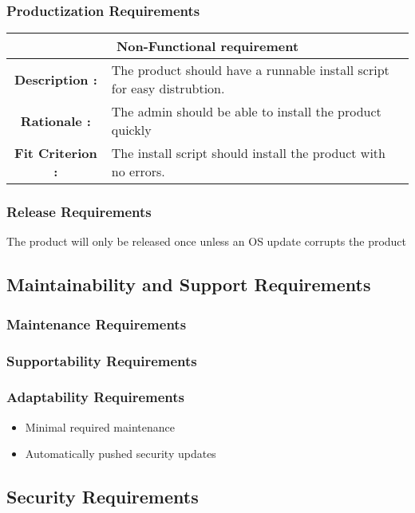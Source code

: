 \documentclass[12pt, titlepage]{article}
\begin{document}
\subsubsection{Productization Requirements}
\begin{center}
\begin{table}[H]
\begin{tabularx}{\textwidth}{| c X |}
\hline
\multicolumn{2}{|c|}{\textbf{Non-Functional requirement}}\\
\hline 
\textbf{Description : } &The product should have a runnable install script for easy distrubtion.\\ 
\hline 
\textbf{Rationale : } & The admin should be able to install the product quickly \\
\hline
\textbf{Fit Criterion : } & The install script should install the product with no errors. \\
\hline
\end{tabularx}
\end{table}
\end{center}
\subsubsection{Release Requirements}
The product will only be released once unless an OS update corrupts the product


\subsection{Maintainability and Support Requirements}
\subsubsection{Maintenance Requirements}
\subsubsection{Supportability Requirements}
\subsubsection{Adaptability Requirements}
\begin{itemize}
\item Minimal required maintenance
\item Automatically pushed security updates
\end{itemize}

\subsection{Security Requirements}
\end{document}
